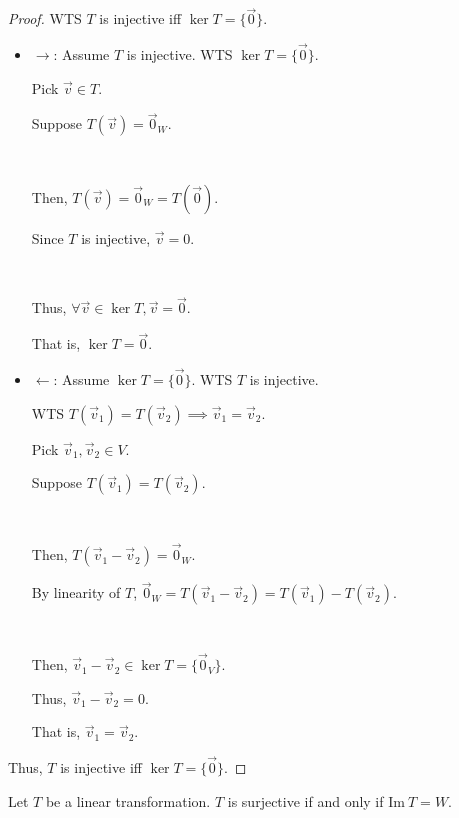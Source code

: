 \documentclass[11pt,fleqn]{book} %
\begin{document}
\begin{proof}
    WTS $T$ is injective iff $\ker T = \{\vec{0} \}$.
    
    \begin{itemize}
        \item $\rightarrow$: Assume $T$ is injective. WTS $\ker T = \{\vec{0} \}$. 
        
        Pick $\vec{v} \in T$. 
        
        Suppose $T(\vec{v})=\vec{0}_W$. 
        
        {~~~}

        Then, $T(\vec{v}) = \vec{0}_W = T(\vec{0})$. 
        
        Since $T$ is injective, $\vec{v} = 0$. 
        
        {~~~}

        Thus, $\forall \vec{v} \in \ker T, \vec{v} = \vec{0}$.
        
        That is, $\ker T=\vec{0}$. 
        
        \item $\leftarrow$: Assume $\ker T = \{\vec{0} \}$. WTS $T$ is injective. 
        
        WTS $T(\vec{v}_1) = T(\vec{v}_2) \implies \vec{v}_1 = \vec{v}_2$. 

        Pick $\vec{v}_1, \vec{v}_2 \in V$. 
        
        Suppose $T(\vec{v}_1)=T(\vec{v}_2)$. 

        {~~~}

        Then, $T(\vec{v}_1 - \vec{v}_2) = \vec{0}_W$. 
        
        By linearity of $T$, $\vec{0}_W = T(\vec{v}_1 - \vec{v}_2) = T(\vec{v}_1) - T(\vec{v}_2)$. 
        
        {~~~}

        Then, $\vec{v}_1 - \vec{v}_2 \in \ker T = \{ \vec{0}_V \}$. 
        
        Thus, $\vec{v}_1 - \vec{v}_2 = 0$. 
        
        That is, $\vec{v}_1 = \vec{v}_2$. 
    \end{itemize}
    
    Thus, $T$ is injective iff $\ker T = \{\vec{0} \}$. 
\end{proof}

\begin{proposition}
    Let $T$ be a linear transformation. $T$ is surjective if and only if $\mathrm{Im}~T=W$. 
\end{proposition}
\setcounter{section}{2}
\end{document}

